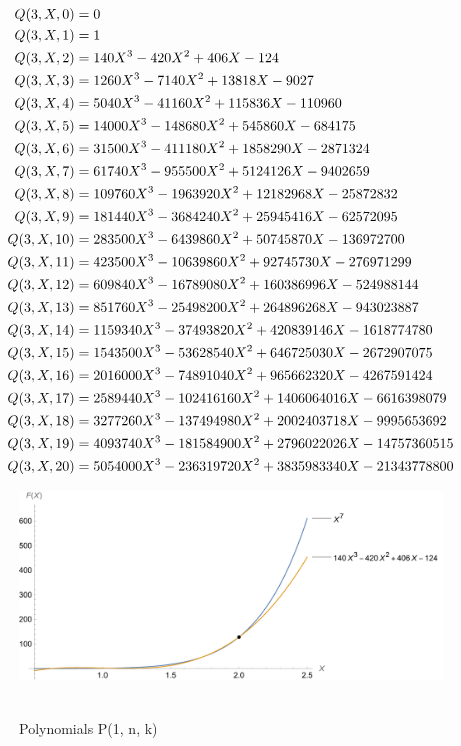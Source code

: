 ﻿\begin{align*}
    {Q}(3,X,0) &= 0 \\
    {Q}(3,X,1) &= 1 \\
    {Q}(3,X,2) &= 140X^3 - 420X^2 + 406X - 124 \\
    {Q}(3,X,3) &= 1260X^3 - 7140X^2 + 13818X - 9027 \\
    {Q}(3,X,4) &= 5040X^3 - 41160X^2 + 115836X - 110960 \\
    {Q}(3,X,5) &= 14000X^3 - 148680X^2 + 545860X - 684175 \\
    {Q}(3,X,6) &= 31500X^3 - 411180X^2 + 1858290X - 2871324 \\
    {Q}(3,X,7) &= 61740X^3 - 955500X^2 + 5124126X - 9402659 \\
    {Q}(3,X,8) &= 109760X^3 - 1963920X^2 + 12182968X - 25872832 \\
    {Q}(3,X,9) &= 181440X^3 - 3684240X^2 + 25945416X - 62572095 \\
    {Q}(3,X,10) &= 283500X^3 - 6439860X^2 + 50745870X - 136972700 \\
    {Q}(3,X,11) &= 423500X^3 - 10639860X^2 + 92745730X - 276971299 \\
    {Q}(3,X,12) &= 609840X^3 - 16789080X^2 + 160386996X - 524988144 \\
    {Q}(3,X,13) &= 851760X^3 - 25498200X^2 + 264896268X - 943023887 \\
    {Q}(3,X,14) &= 1159340X^3 - 37493820X^2 + 420839146X - 1618774780 \\
    {Q}(3,X,15) &= 1543500X^3 - 53628540X^2 + 646725030X - 2672907075 \\
    {Q}(3,X,16) &= 2016000X^3 - 74891040X^2 + 965662320X - 4267591424 \\
    {Q}(3,X,17) &= 2589440X^3 - 102416160X^2 + 1406064016X - 6616398079 \\
    {Q}(3,X,18) &= 3277260X^3 - 137494980X^2 + 2002403718X - 9995653692 \\
    {Q}(3,X,19) &= 4093740X^3 - 181584900X^2 + 2796022026X - 14757360515 \\
    {Q}(3,X,20) &= 5054000X^3 - 236319720X^2 + 3835983340X - 21343778800
\end{align*}
\begin{figure}[H]
    \centering
    \includegraphics[width=1\textwidth]{sections/images/06_seventh_power_with_q_3_n_k}
    ~\caption{Polynomials P(1, n, k)}\label{fig:figure6}
\end{figure}
